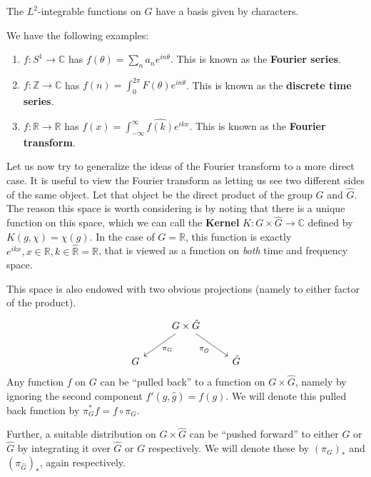 		\begin{obs}
			The $L^2$-integrable functions on $G$ have a basis given by characters. 
		\end{obs}
		\begin{eg}
			We have the following examples:
			\begin{enumerate}
				\item $f: S^1 \to \mathbb C$ has $f(\theta) = \sum_{n} a_n e^{i n \theta}$. This is known as the \textbf{Fourier series}.
				\item $f: \mathbb Z \to \mathbb C$ has $f(n) = \int_{0}^{2\pi} F(\theta) e^{i n \theta}$. This is known as the \textbf{discrete time series}.
				\item $f: \mathbb R \to \mathbb R$ has $f(x) = \int_{-\infty}^\infty \widehat{f(k)} e^{ikx}$. This is known as the \textbf{Fourier transform}.
			\end{enumerate}
		\end{eg}
		
		Let us now try to generalize the ideas of the Fourier transform to a more direct case. It is useful to view the Fourier transform as letting us see two different sides of the same object. Let that object be the direct product of the group $G$ and $\hat G$. 
		The reason this space is worth considering is by noting that there is a unique function on this space, which we can call the \textbf{Kernel} $K: G \times \hat G \to \mathbb C$ defined by $K(g, \chi) = \chi (g)$. In the case of  $G=\mathbb R$, this function is exactly $e^{i k x}, x \in \mathbb R, k \in \widehat{ \mathbb R} = \mathbb R$, that is viewed as a function on \emph{both} time and frequency space.
		
		This space is also endowed with two obvious projections (namely to either factor of the product).		
		\[
		\begin{tikzcd}
		  & G \times \hat G \arrow[ld,"\pi_G"] \arrow[rd,swap,"\pi_{\hat G}"]&\\
		G & & \hat G
		\end{tikzcd}
		\]
		Any function $f$ on $G$ can be ``pulled back'' to a function on $G \times \hat G$, namely by ignoring the second component $f'(g, \hat g) = f(g)$. We will denote this pulled back function by $\pi_{G}^* f = f \circ \pi_G$.
		
		Further, a suitable distribution on $G \times \hat G$ can be ``pushed forward'' to either $G$ or $\hat G$ by integrating it over $\hat G$ or $G$ respectively. We will denote these by $(\pi_G)_*$ and $(\pi_{\hat G})_*$, again respectively.
		
